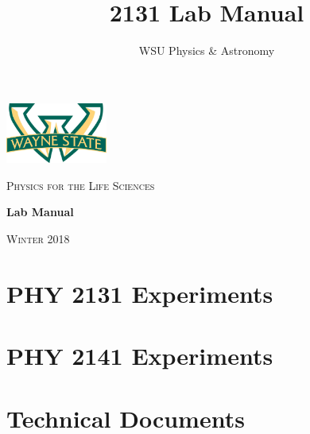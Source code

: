 \documentclass[hidelinks,12pt,letterpaper,twoside]{book}
\author{WSU Physics \& Astronomy}
\title{2131 Lab Manual}
\newcommand\blankpage{%
    \null
    \thispagestyle{empty}%
    \newpage}
\begin{document}
\begin{titlepage}
	\centering
	\includegraphics[width=0.25\textwidth]{wsu_logo}\par\vspace{1cm}
	{\scshape\LARGE Physics for the Life Sciences \par}	
	\vfill
	\textbf{\huge Lab Manual} \par
	\vfill
	{\scshape\large Winter 2018 \par}
\end{titlepage}

\newpage{\blankpage}



\newpage{\blankpage}

\renewcommand\contentsname{Physics for the Life Sciences}
\setcounter{tocdepth}{1}
\tableofcontents{\thispagestyle{fancy}}


\part{PHY 2131 Experiments}
\renewcommand{\chaptername}{Experiment}






\part{PHY 2141 Experiments}
\setcounter{chapter}{5}

\newpage{\blankpage}






\part{Technical Documents}
\renewcommand{\chaptername}{Technical Document}
\renewcommand\thechapter{\Alph{chapter}}
\newpage{\blankpage}
\newpage{\blankpage}
\newpage{\blankpage}
\newpage{\blankpage}
\newpage{\blankpage}
\end{document}
